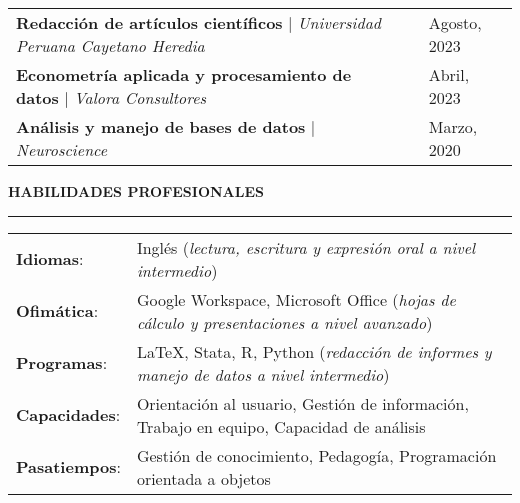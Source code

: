 \documentclass{resume}
\begin{document}
\vspace{-3mm}

\begin{table}[H]
	\begin{tabular}{lll}
		{\bf Redacción de artículos científicos} $|$ {\it Universidad Peruana Cayetano Heredia} & \hspace{7.5mm} & {\color{vino}\faCalendarCheckO} {Agosto, 2023} \\
		{\bf Econometría aplicada y procesamiento de datos} $|$ {\it Valora Consultores} &  & {\color{vino}\faCalendarCheckO} {Abril, 2023} \\
		{\bf Análisis y manejo de bases de datos} $|$ {\it Neuroscience} &  & {\color{vino}\faCalendarCheckO} {Marzo, 2020}
	\end{tabular}
\end{table}




{\color{vino} \noindent\MakeUppercase{\large \bf Habilidades profesionales} \\
\rule[3mm]{\textwidth}{0.5mm}}

\vspace{-3mm}

\begin{table}[H]
	\begin{tabular}{ll}
		{\bf Idiomas}: & Inglés ({\it lectura, escritura y expresión oral a nivel intermedio}) \\
		{\bf Ofimática}: & Google Workspace, Microsoft Office ({\it hojas de cálculo y presentaciones a nivel avanzado}) \\
		{\bf Programas}: & \LaTeX, Stata, R, Python ({\it redacción de informes y manejo de datos a nivel intermedio}) \\
		{\bf Capacidades}: & Orientación al usuario, Gestión de información, Trabajo en equipo, Capacidad de análisis \\
		{\bf Pasatiempos}: & Gestión de conocimiento, Pedagogía, Programación orientada a objetos
	\end{tabular}
\end{table}
\end{document}
